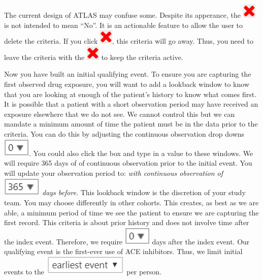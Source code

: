 \documentclass[11pt]{book}
\theoremstyle{definition}
\theoremstyle{definition}
\theoremstyle{definition}
\theoremstyle{remark}
\let\BeginKnitrBlock\begin \let\EndKnitrBlock\end
\begin{document}
\BeginKnitrBlock{rmdimportant}
The current design of ATLAS may confuse some. Despite its apperance, the \includegraphics{images/Cohorts/redX.png} is not intended to mean ``No''. It is an actionable feature to allow the user to delete the criteria. If you click \includegraphics{images/Cohorts/redX.png}, this criteria will go away. Thus, you need to leave the criteria with the \includegraphics{images/Cohorts/redX.png} to keep the criteria active.
\EndKnitrBlock{rmdimportant}

Now you have built an initial qualifying event. To ensure you are capturing the first observed drug exposure, you will want to add a lookback window to know that you are looking at enough of the patient's history to know what comes first. It is possible that a patient with a short observation period may have received an exposure elsewhere that we do not see. We cannot control this but we can mandate a minimum amount of time the patient must be in the data prior to the criteria. You can do this by adjusting the continuous observation drop downs \includegraphics{images/Cohorts/0.png}. You could also click the box and type in a value to these windows. We will require 365 days of of continuous observation prior to the initial event. You will update your observation period to: \emph{with continuous observation of \includegraphics{images/Cohorts/365.png} days before}. This lookback window is the discretion of your study team. You may choose differently in other cohorts. This creates, as best as we are able, a minimum period of time we see the patient to ensure we are capturing the first record. This criteria is about prior history and does not involve time after the index event. Therefore, we require \includegraphics{images/Cohorts/0.png} days after the index event. Our qualifying event is the first-ever use of ACE inhibitors. Thus, we limit initial events to the \includegraphics{images/Cohorts/earliestevent.png} per person.
\end{document}
